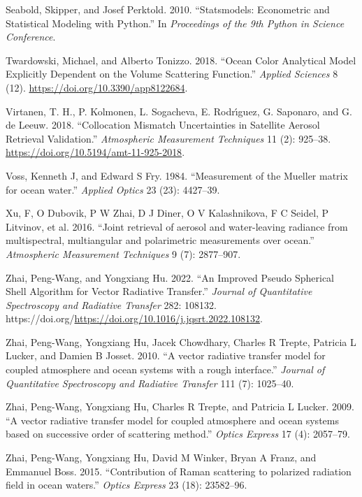\documentclass[
  11pt,
  letterpaper,
  DIV=11,
  numbers=noendperiod]{scrreprt}
\newlength{\cslhangindent}
\newenvironment{CSLReferences}[2] %
 {\begin{list}{}{%
  \setlength{\itemindent}{0pt}
  \setlength{\leftmargin}{0pt}
  \setlength{\parsep}{0pt}
  \ifodd #1
   \setlength{\leftmargin}{\cslhangindent}
   \setlength{\itemindent}{-1\cslhangindent}
  \fi
  \setlength{\itemsep}{#2\baselineskip}}}
 {\end{list}}
\begin{document}
\begin{CSLReferences}{1}{0}
Seabold, Skipper, and Josef Perktold. 2010. {``Statsmodels: Econometric
and Statistical Modeling with Python.''} In \emph{Proceedings of the 9th
Python in Science Conference}.

Twardowski, Michael, and Alberto Tonizzo. 2018. {``Ocean Color
Analytical Model Explicitly Dependent on the Volume Scattering
Function.''} \emph{Applied Sciences} 8 (12).
\url{https://doi.org/10.3390/app8122684}.

Virtanen, T. H., P. Kolmonen, L. Sogacheva, E. Rodrı́guez, G. Saponaro,
and G. de Leeuw. 2018. {``Collocation Mismatch Uncertainties in
Satellite Aerosol Retrieval Validation.''} \emph{Atmospheric Measurement
Techniques} 11 (2): 925--38.
\url{https://doi.org/10.5194/amt-11-925-2018}.

Voss, Kenneth J, and Edward S Fry. 1984. {``{Measurement of the Mueller
matrix for ocean water}.''} \emph{Applied Optics} 23 (23): 4427--39.

Xu, F, O Dubovik, P W Zhai, D J Diner, O V Kalashnikova, F C Seidel, P
Litvinov, et al. 2016. {``{Joint retrieval of aerosol and water-leaving
radiance from multispectral, multiangular and polarimetric measurements
over ocean}.''} \emph{Atmospheric Measurement Techniques} 9 (7):
2877--907.

Zhai, Peng-Wang, and Yongxiang Hu. 2022. {``An Improved Pseudo Spherical
Shell Algorithm for Vector Radiative Transfer.''} \emph{Journal of
Quantitative Spectroscopy and Radiative Transfer} 282: 108132.
https://doi.org/\url{https://doi.org/10.1016/j.jqsrt.2022.108132}.

Zhai, Peng-Wang, Yongxiang Hu, Jacek Chowdhary, Charles R Trepte,
Patricia L Lucker, and Damien B Josset. 2010. {``{A vector radiative
transfer model for coupled atmosphere and ocean systems with a rough
interface}.''} \emph{Journal of Quantitative Spectroscopy and Radiative
Transfer} 111 (7): 1025--40.

Zhai, Peng-Wang, Yongxiang Hu, Charles R Trepte, and Patricia L Lucker.
2009. {``{A vector radiative transfer model for coupled atmosphere and
ocean systems based on successive order of scattering method}.''}
\emph{Optics Express} 17 (4): 2057--79.

Zhai, Peng-Wang, Yongxiang Hu, David M Winker, Bryan A Franz, and
Emmanuel Boss. 2015. {``{Contribution of Raman scattering to polarized
radiation field in ocean waters}.''} \emph{Optics Express} 23 (18):
23582--96.


\end{CSLReferences}
\end{document}
